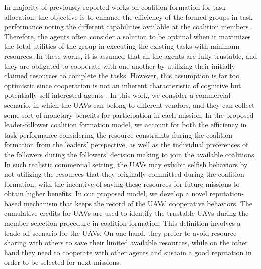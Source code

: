 \documentclass[conference]{IEEEtran}
\theoremstyle{remark}
\theoremstyle{lemma}
\begin{document}
In majority of previously reported works on coalition formation for task allocation, the objective is to enhance the efficiency of the formed groups in task performance noting the different capabilities available at the coalition members \cite{Shehory,Service2011,Dang,Vig,Bayram,Chen}. Therefore, the agents often consider a solution to be optimal when it maximizes the total utilities of the group in executing the existing tasks with minimum resources. In these works, it is assumed that all the agents are fully trustable, and they are obligated to cooperate with one another by utilizing their initially claimed resources to complete the tasks. However, this assumption is far too optimistic since cooperation is not an inherent characteristic of cognitive but potentially self-interested agents \cite{Afghah_NWRCS,Afghah_CDC}. In this work, we consider a commercial scenario, in which the UAVs can belong to different vendors, and they can collect some sort of monetary benefits for participation in each mission. In the proposed leader-follower coalition formation model, we account for both the efficiency in task performance considering the resource constraints during the coalition formation from the leaders' perspective, as well as the individual preferences of the followers during the followers' decision making to join the available coalitions. In such realistic commercial setting, the UAVs may exhibit selfish behaviors by not utilizing the resources that they originally committed during the coalition formation, with the incentive of saving these resources for future missions to obtain higher benefits. In our proposed model, we develop a novel reputation-based mechanism that keeps the record of the UAVs' cooperative behaviors. The cumulative credits for UAVs are used to identify the trustable UAVs during the member selection procedure in coalition formation. This definition involves a trade-off scenario for the UAVs. On one hand, they prefer to avoid resource sharing with others to save their limited available resources, while on the other hand they need to cooperate with other agents and sustain a good reputation in order to be selected for next missions.
\end{document}
